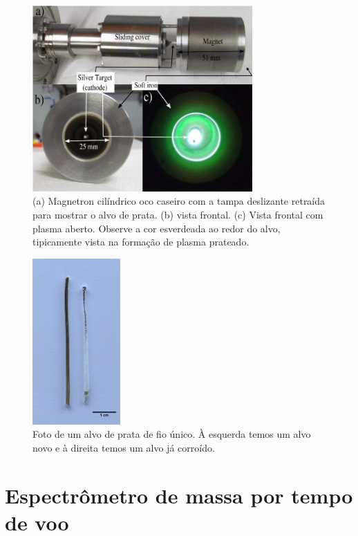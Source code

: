 \begin{figure}
  \centering
  \includegraphics[width=0.75\textwidth]{images/foca/magnetron_cil}
  \caption{ (a) Magnetron cilíndrico oco caseiro com a tampa deslizante retraída para mostrar o alvo de prata. (b) vista frontal. (c) Vista frontal com plasma aberto. Observe a cor esverdeada ao redor do alvo, tipicamente vista na formação de plasma prateado.\cite{livro_vitor} }
  \label{fig:magnetron}  
\end{figure}


\begin{figure}
  \centering
  \includegraphics[width=0.3\textwidth]{images/foca/alvo}
  \caption{ Foto de um alvo de prata de fio único. À esquerda temos um alvo novo e à direita temos um alvo já corroído.  }
  \label{fig:alvo}
\end{figure}






\section{Espectrômetro de massa por tempo de voo}

